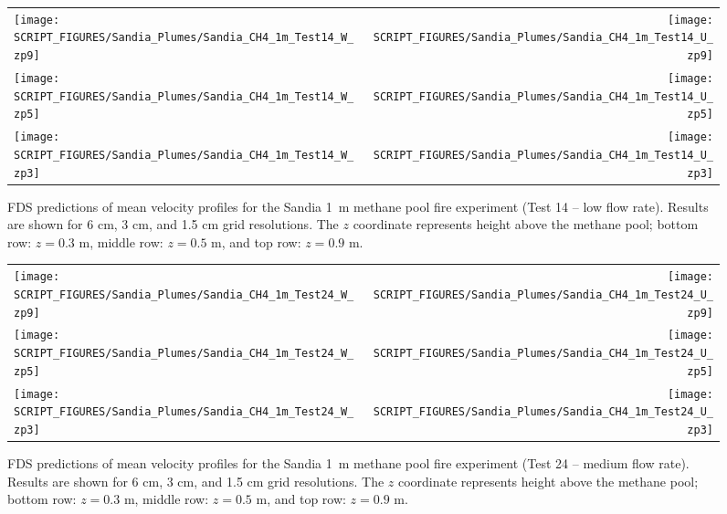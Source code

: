 \begin{figure}[p]
\begin{tabular*}{\textwidth}{l@{\extracolsep{\fill}}r}
\texttt{[image: SCRIPT\_FIGURES/Sandia\_Plumes/Sandia\_CH4\_1m\_Test14\_W\_zp9]} &
\texttt{[image: SCRIPT\_FIGURES/Sandia\_Plumes/Sandia\_CH4\_1m\_Test14\_U\_zp9]} \\
\texttt{[image: SCRIPT\_FIGURES/Sandia\_Plumes/Sandia\_CH4\_1m\_Test14\_W\_zp5]} &
\texttt{[image: SCRIPT\_FIGURES/Sandia\_Plumes/Sandia\_CH4\_1m\_Test14\_U\_zp5]} \\
\texttt{[image: SCRIPT\_FIGURES/Sandia\_Plumes/Sandia\_CH4\_1m\_Test14\_W\_zp3]} &
\texttt{[image: SCRIPT\_FIGURES/Sandia\_Plumes/Sandia\_CH4\_1m\_Test14\_U\_zp3]}
\end{tabular*}
\caption[Sandia 1~m methane pool fire (Test 14) mean velocity profiles]
{FDS predictions of mean velocity profiles for the Sandia 1~m methane pool fire experiment (Test 14 -- low flow rate). Results are shown for 6 cm, 3 cm, and 1.5 cm grid resolutions. The $z$ coordinate represents height above the methane pool; bottom row: $z=0.3$ m, middle row: $z=0.5$ m, and top row: $z=0.9$ m.}
\label{Sandia_CH4_1m_Test14_velocity}
\end{figure}

\begin{figure}[p]
\begin{tabular*}{\textwidth}{l@{\extracolsep{\fill}}r}
\texttt{[image: SCRIPT\_FIGURES/Sandia\_Plumes/Sandia\_CH4\_1m\_Test24\_W\_zp9]} &
\texttt{[image: SCRIPT\_FIGURES/Sandia\_Plumes/Sandia\_CH4\_1m\_Test24\_U\_zp9]} \\
\texttt{[image: SCRIPT\_FIGURES/Sandia\_Plumes/Sandia\_CH4\_1m\_Test24\_W\_zp5]} &
\texttt{[image: SCRIPT\_FIGURES/Sandia\_Plumes/Sandia\_CH4\_1m\_Test24\_U\_zp5]} \\
\texttt{[image: SCRIPT\_FIGURES/Sandia\_Plumes/Sandia\_CH4\_1m\_Test24\_W\_zp3]} &
\texttt{[image: SCRIPT\_FIGURES/Sandia\_Plumes/Sandia\_CH4\_1m\_Test24\_U\_zp3]}
\end{tabular*}
\caption[Sandia 1~m methane pool fire (Test 24) mean velocity profiles]
{FDS predictions of mean velocity profiles for the Sandia 1~m methane pool fire experiment (Test 24 -- medium flow rate). Results are shown for 6 cm, 3 cm, and 1.5 cm grid resolutions. The $z$ coordinate represents height above the methane pool; bottom row: $z=0.3$ m, middle row: $z=0.5$ m, and top row: $z=0.9$ m.}
\label{Sandia_CH4_1m_Test24_velocity}
\end{figure}


